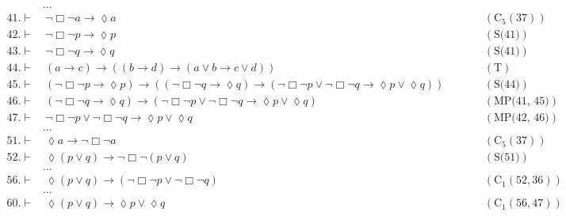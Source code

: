 \documentclass[a4paper, 12pt]{report}
\begin{document}
{{            \begin{equation*}
                \begin{alignedat}{2}
                    & \ldots && \\
                    41. \vdash & \ \lnot \Box \lnot a \to \lozenge a && \quad \quad (\mbox{C}_5(37)) \\
                    42. \vdash & \ \lnot \Box \lnot p \to \lozenge p && \quad \quad (\mbox{S(41)}) \\
                    43. \vdash & \ \lnot \Box \lnot q \to \lozenge q && \quad \quad (\mbox{S(41)}) \\
                    44. \vdash & \ (a \to c) \to ((b \to d) \to (a \lor b \to c \lor d)) && \quad \quad (\mbox{T}) \\
                    45. \vdash & \ (\lnot \Box \lnot p \to \lozenge p ) \to ((\lnot \Box \lnot q \to \lozenge q) \to (\lnot \Box \lnot p \lor \lnot \Box \lnot q \to \lozenge p \lor \lozenge q)) && \quad \quad (\mbox{S(44)}) \\
                    46. \vdash & \ (\lnot \Box \lnot q \to \lozenge q) \to (\lnot \Box \lnot p \lor \lnot \Box \lnot q \to \lozenge p \lor \lozenge q) && \quad \quad (\mbox{MP(41, 45)}) \\
                    47. \vdash & \ \lnot \Box \lnot p \lor \lnot \Box \lnot q \to \lozenge p \lor \lozenge q && \quad \quad (\mbox{MP(42, 46)}) \\
                               & \ldots && \\
                    51. \vdash & \ \lozenge a \to \lnot \Box \lnot a && \quad \quad (\mbox{C}_5(37)) \\
                    52. \vdash & \ \lozenge (p \lor q) \to \lnot \Box \lnot (p \lor q) && \quad \quad (\mbox{S(51)}) \\
                               & \ldots && \\
                    56. \vdash & \ \lozenge (p \lor q) \to (\lnot \Box \lnot p \lor \lnot \Box \lnot q) && \quad \quad (\mbox{C}_1(52, 36)) \\
                               & \ldots && \\
                    60. \vdash & \ \lozenge (p \lor q) \to \lozenge p \lor \lozenge q && \quad \quad (\mbox{C}_1(56, 47)) \\
                \end{alignedat}
            \end{equation*}
        }

}
\end{document}
